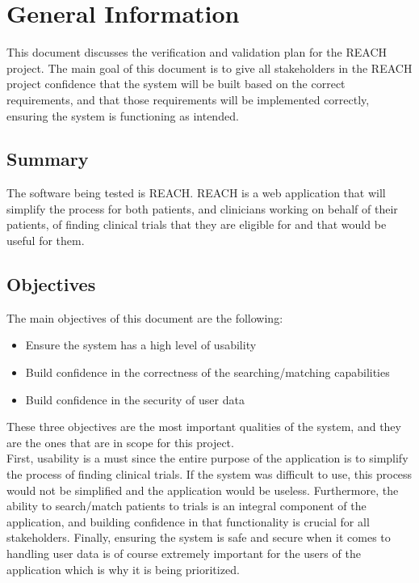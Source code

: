 \documentclass[12pt, titlepage]{article}
\begin{document}

\section{General Information}

This document discusses the verification and validation plan for the REACH project. The main goal of this document
is to give all stakeholders in the REACH project confidence that the system will be built based on the correct 
requirements, and that those requirements will be implemented correctly, ensuring the system is functioning as intended.

\subsection{Summary}

The software being tested is REACH. REACH is a web application that will simplify the process for both patients, and clinicians working 
on behalf of their patients, of finding clinical trials that they are eligible for and that would be useful for them.

\subsection{Objectives}

The main objectives of this document are the following:

\begin{itemize}
  \item Ensure the system has a high level of usability
  \item Build confidence in the correctness of the searching/matching capabilities
  \item Build confidence in the security of user data
\end{itemize}

These three objectives are the most important qualities of the system, and they are the ones that are in scope for this project. \\

First, usability is a must
since the entire purpose of the application is to simplify the process of finding clinical trials. If the system was difficult to use, this process 
would not be simplified and the application would be useless. 
Furthermore, the ability to search/match patients to trials is an integral component of the application, and building confidence in 
that functionality is crucial for all stakeholders. Finally, ensuring the system is safe and secure when it comes to handling user data is of course 
extremely important for the users of the application which is why it is being prioritized.
\end{document}
